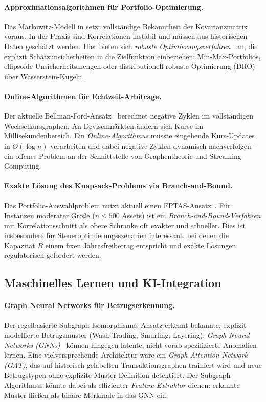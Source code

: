 \documentclass[a4paper,12pt]{article}
\begin{document}
\paragraph{Approximationsalgorithmen für Portfolio-Optimierung.}
Das Markowitz-Modell in \cite{markowitz1952} setzt vollständige Bekanntheit der
Kovarianzmatrix voraus. In der Praxis sind Korrelationen instabil und
müssen aus historischen Daten geschätzt werden. Hier bieten sich
\emph{robuste Optimierungsverfahren}~\cite{rockafellar2000} an, die explizit
Schätzunsicherheiten in die Zielfunktion einbeziehen: Min-Max-Portfolios,
ellipsoide Unsicherheitsmengen oder distributionell robuste Optimierung
(DRO) über Wasserstein-Kugeln.

\paragraph{Online-Algorithmen für Echtzeit-Arbitrage.}
Der aktuelle Bellman-Ford-Ansatz~\cite{bellman1958} berechnet negative Zyklen
im vollständigen Wechselkursgraphen. An Devisenmärkten ändern sich Kurse im
Millisekundenbereich. Ein \emph{Online-Algorithmus} müsste eingehende
Kurs-Updates in $O(\log n)$ verarbeiten und dabei negative Zyklen dynamisch
nachverfolgen – ein offenes Problem an der Schnittstelle von
Graphentheorie und Streaming-Computing.

\paragraph{Exakte Lösung des Knapsack-Problems via Branch-and-Bound.}
Das Portfolio-Auswahlproblem nutzt aktuell einen FPTAS-Ansatz~\cite{garey1979}.
Für Instanzen moderater Größe ($n \leq 500$ Assets) ist ein
\emph{Branch-and-Bound-Verfahren} mit Korrelationsschnitt als
obere Schranke oft exakter und schneller. Dies ist insbesondere für
Steueroptimierungsszenarien interessant, bei denen die Kapazität $B$
einem fixen Jahresfreibetrag entspricht und exakte Lösungen regulatorisch
gefordert werden.

\subsection{Maschinelles Lernen und KI-Integration}
\label{sub:ausblick_ml}

\paragraph{Graph Neural Networks für Betrugserkennung.}
Der regelbasierte Subgraph-Iso\-morphismus-Ansatz erkennt bekannte,
explizit modellierte Betrugsmuster (Wash-Trading, Smurfing, Layering).
\emph{Graph Neural Networks (GNNs)}~\cite{garey1979} können hingegen latente,
nicht vorab spezifizierte Anomalien lernen. Eine vielversprechende Architektur
wäre ein \emph{Graph Attention Network (GAT)}, das auf historisch gelabelten
Transaktionsgraphen trainiert wird und neue Betrugstypen ohne explizite
Muster-Definition detektiert. Der Subgraph Algorithmus könnte dabei als
effizienter \emph{Feature-Extraktor} dienen: erkannte Muster fließen als
binäre Merkmale in das GNN ein.
\end{document}

